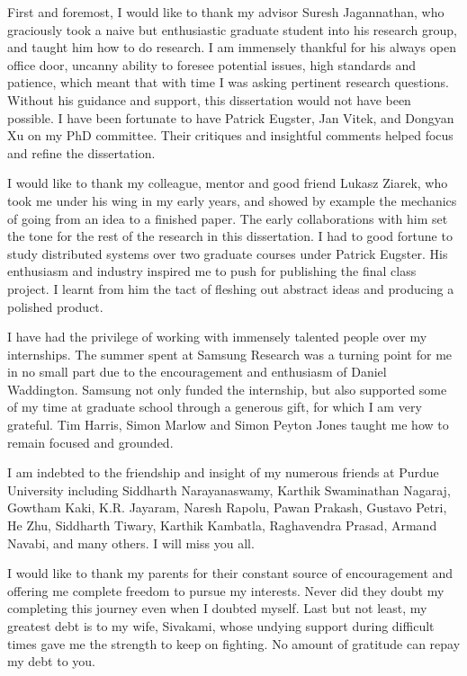 \begin{acknowledgments}

First and foremost, I would like to thank my advisor Suresh Jagannathan, who
graciously took a naive but enthusiastic graduate student into his research
group, and taught him how to do research. I am immensely thankful for his
always open office door, uncanny ability to foresee potential issues, high
standards and patience, which meant that with time I was asking pertinent
research questions. Without his guidance and support, this dissertation would
not have been possible. I have been fortunate to have Patrick Eugster, Jan
Vitek, and Dongyan Xu on my PhD committee. Their critiques and insightful
comments helped focus and refine the dissertation.

I would like to thank my colleague, mentor and good friend Lukasz Ziarek, who
took me under his wing in my early years, and showed by example the mechanics
of going from an idea to a finished paper. The early collaborations with him
set the tone for the rest of the research in this dissertation. I had to good
fortune to study distributed systems over two graduate courses under
Patrick Eugster. His enthusiasm and industry inspired me to push for publishing
the final class project. I learnt from him the tact of fleshing out abstract
ideas and producing a polished product.

I have had the privilege of working with immensely talented people over my
internships. The summer spent at Samsung Research was a turning point for me in
no small part due to the encouragement and enthusiasm of Daniel Waddington.
Samsung not only funded the internship, but also supported some of my time at
graduate school through a generous gift, for which I am very grateful. Tim
Harris, Simon Marlow and Simon Peyton Jones taught me how to remain focused and
grounded.

I am indebted to the friendship and insight of my numerous friends at Purdue
University including Siddharth Narayanaswamy, Karthik Swaminathan Nagaraj,
Gowtham Kaki, K.R. Jayaram, Naresh Rapolu, Pawan Prakash, Gustavo Petri, He
Zhu, Siddharth Tiwary, Karthik Kambatla, Raghavendra Prasad, Armand Navabi, and
many others. I will miss you all.

I would like to thank my parents for their constant source of encouragement and
offering me complete freedom to pursue my interests. Never did they doubt my
completing this journey even when I doubted myself. Last but not least, my
greatest debt is to my wife, Sivakami, whose undying support during difficult
times gave me the strength to keep on fighting. No amount of gratitude can
repay my debt to you.
\end{acknowledgments}

